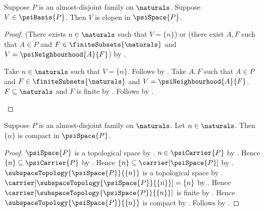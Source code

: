 \begin{theorem}\label{psi_basic_set_clopen}
    Suppose $P$ is an almost-disjoint family on $\naturals$.
    Suppose $V\in\psiBasis{P}$.
    Then $V$ is clopen in $\psiSpace{P}$.
\end{theorem}
\begin{proof}
    (There exists $n\in\naturals$ such that $V=\{n\}$) or
        (there exist $A,F$ such that $A\in P$ and
            $F\in\finiteSubsets{\naturals}$ and
            $V=\psiNeighbourhood{A}{F}$)
        by .
    \begin{byCase}
            Take $n\in\naturals$ such that $V=\{n\}$.
            Follows by .
            Take $A,F$ such that $A\in P$ and
                $F\in\finiteSubsets{\naturals}$ and
                $V=\psiNeighbourhood{A}{F}$.
            $F\subseteq\naturals$ and $F$ is finite
                by .
            Follows by .
    \end{byCase}
\end{proof}

\begin{theorem}\label{psi_natural_singleton_compact}
    Suppose $P$ is an almost-disjoint family on $\naturals$.
    Let $n\in\naturals$.
    Then $\{n\}$ is compact in $\psiSpace{P}$.
\end{theorem}
\begin{proof}
    $\psiSpace{P}$ is a topological space
        by .
    $n\in\psiCarrier{P}$ by
        .
    Hence $\{n\}\subseteq\psiCarrier{P}$
        by .
    Hence $\{n\}\subseteq\carrier[\psiSpace{P}]$
        by .
    $\subspaceTopology{\psiSpace{P}}{\{n\}}$ is a topological space
        by .
    $\carrier[\subspaceTopology{\psiSpace{P}}{\{n\}}]=\{n\}$
        by .
    Hence $\carrier[\subspaceTopology{\psiSpace{P}}{\{n\}}]$ is finite
        by .
    Hence $\subspaceTopology{\psiSpace{P}}{\{n\}}$ is compact
        by .
    Follows by .
\end{proof}

